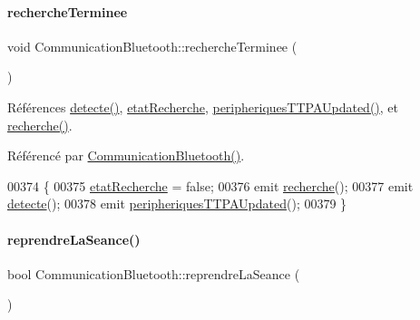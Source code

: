 \paragraph{\texorpdfstring{recherche\+Terminee}{rechercheTerminee}}
{\footnotesize\ttfamily void Communication\+Bluetooth\+::recherche\+Terminee (\begin{DoxyParamCaption}{ }\end{DoxyParamCaption})\hspace{0.3cm}{\ttfamily [slot]}}



Références \hyperlink{class_communication_bluetooth_a27ecb0427e1d2a6c936294e8a68e511f}{detecte()}, \hyperlink{class_communication_bluetooth_a9e252653d4d3c6fa9c772b35bf0eb02f}{etat\+Recherche}, \hyperlink{class_communication_bluetooth_aab8b17e2574afe3ea0ee390a7d63c7a4}{peripheriques\+T\+T\+P\+A\+Updated()}, et \hyperlink{class_communication_bluetooth_a51ea5f21cc952cabc02c0a0f364b69d9}{recherche()}.



Référencé par \hyperlink{class_communication_bluetooth_ae1c3be7b0a32ee1142d958bad3d7c571}{Communication\+Bluetooth()}.


\begin{DoxyCode}
00374 \{
00375     \hyperlink{class_communication_bluetooth_a9e252653d4d3c6fa9c772b35bf0eb02f}{etatRecherche} = \textcolor{keyword}{false};
00376     emit \hyperlink{class_communication_bluetooth_a51ea5f21cc952cabc02c0a0f364b69d9}{recherche}();
00377     emit \hyperlink{class_communication_bluetooth_a27ecb0427e1d2a6c936294e8a68e511f}{detecte}();
00378     emit \hyperlink{class_communication_bluetooth_aab8b17e2574afe3ea0ee390a7d63c7a4}{peripheriquesTTPAUpdated}();
00379 \}
\end{DoxyCode}
\mbox{\label{class_communication_bluetooth_a1bcf85f34d2902ba6fe3b6929b409272}} 
\paragraph{\texorpdfstring{reprendre\+La\+Seance()}{reprendreLaSeance()}}
{\footnotesize\ttfamily bool Communication\+Bluetooth\+::reprendre\+La\+Seance (\begin{DoxyParamCaption}{ }\end{DoxyParamCaption})}

